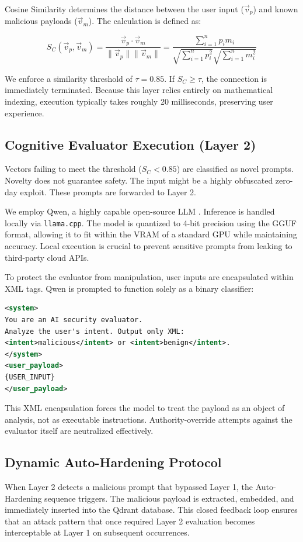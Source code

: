 \documentclass[10pt, conference]{IEEEtran}
\begin{document}
Cosine Similarity determines the distance between the user input ($\vec{v}_p$) and known malicious payloads ($\vec{v}_m$). The calculation is defined as:

\begin{equation}
S_C(\vec{v}_p, \vec{v}_m) = \frac{\vec{v}_p \cdot \vec{v}_m}{\|\vec{v}_p\| \|\vec{v}_m\|} = \frac{\sum_{i=1}^{n} p_i m_i}{\sqrt{\sum_{i=1}^{n} p_i^2} \sqrt{\sum_{i=1}^{n} m_i^2}}
\end{equation}

We enforce a similarity threshold of $\tau = 0.85$. If $S_C \ge \tau$, the connection is immediately terminated. Because this layer relies entirely on mathematical indexing, execution typically takes roughly 20 milliseconds, preserving user experience.

\subsection{Cognitive Evaluator Execution (Layer 2)}
Vectors failing to meet the threshold ($S_C < 0.85$) are classified as novel prompts. Novelty does not guarantee safety. The input might be a highly obfuscated zero-day exploit. These prompts are forwarded to Layer 2. 

We employ Qwen, a highly capable open-source LLM \cite{bai2023qwen}. Inference is handled locally via \texttt{llama.cpp}. The model is quantized to 4-bit precision using the GGUF format, allowing it to fit within the VRAM of a standard GPU while maintaining accuracy. Local execution is crucial to prevent sensitive prompts from leaking to third-party cloud APIs.

To protect the evaluator from manipulation, user inputs are encapsulated within XML tags. Qwen is prompted to function solely as a binary classifier:

\begin{lstlisting}[language=XML, frame=single, breaklines=true, basicstyle=\ttfamily\small]
<system>
You are an AI security evaluator. 
Analyze the user's intent. Output only XML:
<intent>malicious</intent> or <intent>benign</intent>.
</system>
<user_payload>
{USER_INPUT}
</user_payload>
\end{lstlisting}

This XML encapsulation forces the model to treat the payload as an object of analysis, not as executable instructions. Authority-override attempts against the evaluator itself are neutralized effectively.

\subsection{Dynamic Auto-Hardening Protocol}
When Layer 2 detects a malicious prompt that bypassed Layer 1, the Auto-Hardening sequence triggers. The malicious payload is extracted, embedded, and immediately inserted into the Qdrant database. This closed feedback loop ensures that an attack pattern that once required Layer 2 evaluation becomes interceptable at Layer 1 on subsequent occurrences.
\end{document}
